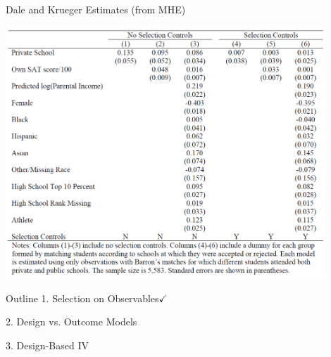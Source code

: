 \documentclass[11pt, english]{beamer}
\begin{document}
	\begin{frame}{Dale and Krueger Estimates (from MHE)}
		\vspace{-0.1cm}
		\begin{center}
			\includegraphics[width=0.9\textwidth]{figures/DK02.png}
		\end{center}
	\end{frame}

	\begin{frame}{Outline}
		\textcolor{red!75!green!50!blue!25!gray}{1. Selection on Observables}$\checkmark$
		\vspace{0.8cm}

		2. Design vs. Outcome Models
		\vspace{0.8cm}

		\textcolor{red!75!green!50!blue!25!gray}{3. Design-Based IV}
	\end{frame}
\end{document}
